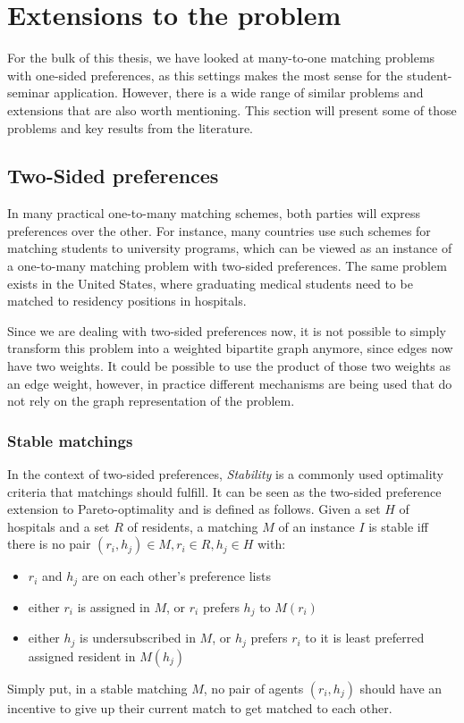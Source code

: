 \section{Extensions to the problem}
For the bulk of this thesis, we have looked at many-to-one matching problems with one-sided preferences, as this settings makes the most sense for the student-seminar application. However, there is a wide range of similar problems and extensions that are also worth mentioning. This section will present some of those problems and key results from the literature. 

\subsection{Two-Sided preferences}\label{extensions:two-sided}
In many practical one-to-many matching schemes, both parties will express preferences over the other. For instance, many countries use such schemes for matching students to university programs, which can be viewed as an instance of a one-to-many matching problem with two-sided preferences. The same problem exists in the United States, where graduating medical students need to be matched to residency positions in hospitals. 

Since we are dealing with two-sided preferences now, it is not possible to simply transform this problem into a weighted bipartite graph anymore, since edges now have two weights. It could be possible to use the product of those two weights as an edge weight, however, in practice different mechanisms are being used that do not rely on the graph representation of the problem.

\subsubsection{Stable matchings}
In the context of two-sided preferences, \emph{Stability} is a commonly used optimality criteria that matchings should fulfill. It can be seen as the two-sided preference extension to Pareto-optimality and is defined as follows. Given a set $H$ of hospitals and a set $R$ of residents, a matching $M$ of an instance $I$ is stable iff there is no pair $(r_i, h_j) \in M, r_i \in R, h_j \in H$ with:
\begin{itemize}
    \item $r_i$ and $h_j$ are on each other's preference lists
    \item either $r_i$ is assigned in $M$, or $r_i$ prefers $h_j$ to $M(r_i)$
    \item either $h_j$ is undersubscribed in $M$, or $h_j$ prefers $r_i$ to it is least preferred assigned resident in $M(h_j)$
\end{itemize}
Simply put, in a stable matching $M$, no pair of agents $(r_i, h_j)$ should have an incentive to give up their current match to get matched to each other.

